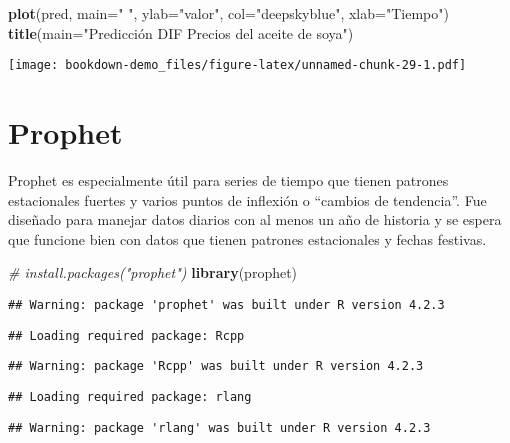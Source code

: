 \documentclass[
]{book}
\newenvironment{Shaded}{\begin{snugshade}}{\end{snugshade}}
\newcommand{\AttributeTok}[1]{\textcolor[rgb]{0.13,0.29,0.53}{#1}}
\newcommand{\CommentTok}[1]{\textcolor[rgb]{0.56,0.35,0.01}{\textit{#1}}}
\newcommand{\FunctionTok}[1]{\textcolor[rgb]{0.13,0.29,0.53}{\textbf{#1}}}
\newcommand{\NormalTok}[1]{#1}
\newcommand{\StringTok}[1]{\textcolor[rgb]{0.31,0.60,0.02}{#1}}
\begin{document}
\begin{Shaded}
\begin{Highlighting}[]
\FunctionTok{plot}\NormalTok{(pred, }\AttributeTok{main=}\StringTok{" "}\NormalTok{, }\AttributeTok{ylab=}\StringTok{"valor"}\NormalTok{, }\AttributeTok{col=}\StringTok{"deepskyblue"}\NormalTok{, }\AttributeTok{xlab=}\StringTok{"Tiempo"}\NormalTok{)}
\FunctionTok{title}\NormalTok{(}\AttributeTok{main=}\StringTok{"Predicción DIF Precios del aceite de soya"}\NormalTok{)}
\end{Highlighting}
\end{Shaded}

\texttt{[image: bookdown-demo\_files/figure-latex/unnamed-chunk-29-1.pdf]}

\hypertarget{prophet}{%
\chapter{Prophet}\label{prophet}}

Prophet es especialmente útil para series de tiempo que tienen patrones estacionales fuertes y varios puntos de inflexión o ``cambios de tendencia''. Fue diseñado para manejar datos diarios con al menos un año de historia y se espera que funcione bien con datos que tienen patrones estacionales y fechas festivas.

\begin{Shaded}
\begin{Highlighting}[]
\CommentTok{\# install.packages("prophet")}
\FunctionTok{library}\NormalTok{(prophet)}
\end{Highlighting}
\end{Shaded}

\begin{verbatim}
## Warning: package 'prophet' was built under R version 4.2.3
\end{verbatim}

\begin{verbatim}
## Loading required package: Rcpp
\end{verbatim}

\begin{verbatim}
## Warning: package 'Rcpp' was built under R version 4.2.3
\end{verbatim}

\begin{verbatim}
## Loading required package: rlang
\end{verbatim}

\begin{verbatim}
## Warning: package 'rlang' was built under R version 4.2.3
\end{verbatim}
\end{document}
